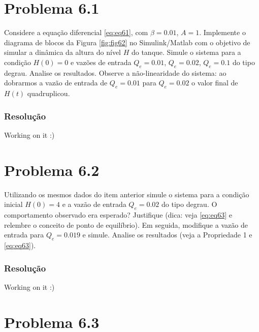 \documentclass[
]{book}
\theoremstyle{definition}
\theoremstyle{definition}
\theoremstyle{definition}
\theoremstyle{remark}
\begin{document}
\hypertarget{problema-6.1}{%
\section*{Problema 6.1}\label{problema-6.1}}

Considere a equação diferencial \eqref{eq:eq61}, com \(\beta = 0.01\), \(A = 1\). Implemente o diagrama de blocos da Figura \ref{fig:fig62} no Simulink/Matlab com o objetivo de simular a dinâmica da altura do nível \(H\) do tanque. Simule o sistema para a condição \(H(0) = 0\) e vazões de entrada \(Q_e = 0.01\), \(Q_e = 0.02\), \(Q_e = 0.1\) do tipo degrau. Analise os resultados. Observe a não-linearidade do sistema: ao dobrarmos a vazão de entrada de \(Q_e = 0.01\) para \(Q_e = 0.02\) o valor final de \(H(t)\) quadruplicou.

\hypertarget{resoluuxe7uxe3o}{%
\subsubsection*{Resolução}\label{resoluuxe7uxe3o}}

Working on it :)

\hypertarget{problema-6.2}{%
\section*{Problema 6.2}\label{problema-6.2}}

Utilizando os mesmos dados do item anterior simule o sistema para a condição inicial \(H(0)=4\) e a vazão de entrada \(Q_e = 0.02\) do tipo degrau. O comportamento observado era esperado? Justifique (dica: veja \eqref{eq:eq63} e relembre o conceito de ponto de equilíbrio). Em seguida, modifique a vazão de entrada para \(Q_e = 0.019\) e simule. Analise os resultados (veja a Propriedade 1 e \eqref{eq:eq63}).

\hypertarget{resoluuxe7uxe3o-1}{%
\subsubsection*{Resolução}\label{resoluuxe7uxe3o-1}}

Working on it :)

\hypertarget{problema-6.3}{%
\section*{Problema 6.3}\label{problema-6.3}}
\end{document}
